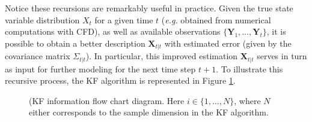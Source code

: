 \documentclass{article}
\theoremstyle{definition}
\theoremstyle{definition}
\theoremstyle{remark}
\theoremstyle{mythmstyle}
\begin{document}
Notice these recursions are remarkably useful in practice. Given the true state variable distribution $X_t$ for a given time $t$ (\textit{e.g.} obtained from numerical computations with CFD), as well as available observations $\{\bm{Y}_1, \dots, \bm{Y}_t\}$, it is possible to obtain a better description $\textbf{X}_{t|t}$ with estimated error (given by the covariance matrix $\Sigma_{t|t}$). In particular, this improved estimation $\textbf{X}_{t|t}$ serves in turn as input for further modeling for the next time step $t + 1$.  
To illustrate this recursive process, the KF algorithm is represented in Figure \ref{fig:diagram}.

\begin{figure}[!ht]
  \centering
  \caption{(KF information flow chart diagram. Here $i\in \{1, \dots, N\}$, where $N$ either corresponds to the sample dimension in the KF algorithm.}
  \label{fig:diagram}
\end{figure}


\end{document}
